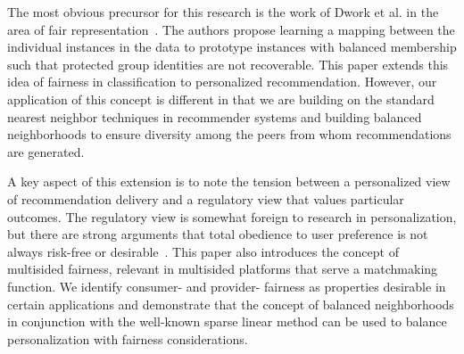 The most obvious precursor for this research is the work of Dwork et al. in the area of fair representation~\cite{zemel2013learning,Dwork2012individual}. The authors propose learning a mapping between the individual instances in the data to prototype instances with balanced membership such that protected group identities are not recoverable. This paper extends this idea of fairness in classification to personalized recommendation. However, our application of this concept is different in that we are building on the standard nearest neighbor techniques in recommender systems and building balanced neighborhoods to ensure diversity among the peers from whom recommendations are generated.

A key aspect of this extension is to note the tension between a personalized view of recommendation delivery and a regulatory view that values particular outcomes. The regulatory view is somewhat foreign to research in personalization, but there are strong arguments that total obedience to user preference is not always risk-free or desirable~\cite{pariser2011filter,sunstein2009republic}. This paper also introduces the concept of multisided fairness, relevant in multisided platforms that serve a matchmaking function. We identify consumer- and provider- fairness as properties desirable in certain applications and demonstrate that the concept of balanced neighborhoods in conjunction with the well-known sparse linear method can be used to balance personalization with fairness considerations.


